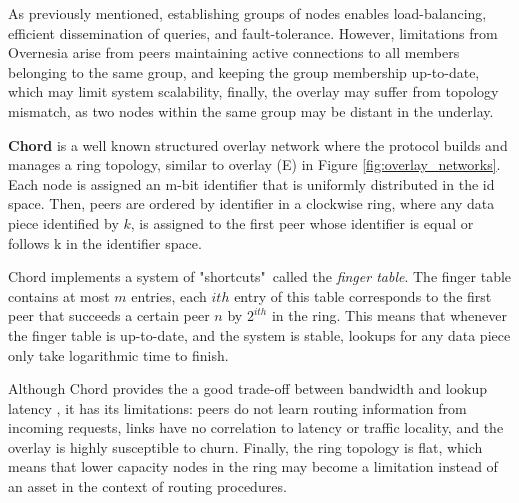As previously mentioned, establishing groups of nodes enables load-balancing, efficient dissemination of queries, and fault-tolerance. However, limitations from Overnesia arise from peers maintaining active connections to all members belonging to the same group, and keeping the group membership up-to-date, which may limit system scalability, finally, the overlay may suffer from topology mismatch, as two nodes within the same group may be distant in the underlay.

\textbf{Chord} \cite{stoica2003chord} is a well known structured overlay network where the protocol builds and manages a ring topology, similar to overlay (E) in Figure \ref{fig:overlay_networks}. Each node is assigned an m-bit identifier that is uniformly distributed in the id space. Then, peers are ordered by identifier in a clockwise ring, where any data piece identified by \(k\), is assigned to the first peer whose identifier is equal or follows k in the identifier space. 

Chord implements a system of "shortcuts"\ called the \textit{finger table}. The finger table contains at most \(m\) entries, each $ith$ entry of this table corresponds to the first peer that succeeds a certain peer \(n\) by \(2^{ith}\) in the ring. This means that whenever the finger table is up-to-date, and the system is stable, lookups for any data piece only take logarithmic time to finish. 

Although Chord provides the a good trade-off between bandwidth and lookup latency \cite{dht_performance_churn}, it has its limitations: peers do not learn routing information from incoming requests, links have no correlation to latency or traffic locality, and the overlay is highly susceptible to churn. Finally, the ring topology is flat, which means that lower capacity nodes in the ring may become a limitation instead of an asset in the context of routing procedures.



